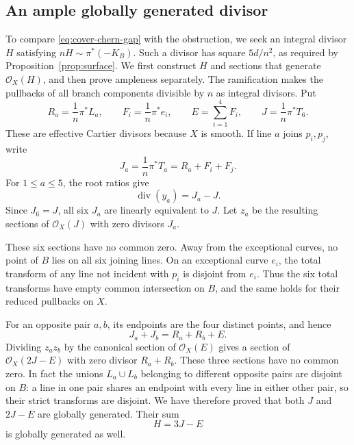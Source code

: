 \subsection{An ample globally generated divisor}

To compare \eqref{eq:cover-chern-gap} with the obstruction, we seek an
integral divisor $H$ satisfying $nH\sim\pi^*(-K_B)$.  Such a divisor has
square $5d/n^2$, as required by Proposition~\ref{prop:surface}.  We first
construct $H$ and sections that generate $\mathcal O_X(H)$, and then
prove ampleness separately.  The ramification makes the pullbacks of all
branch components divisible by $n$ as integral divisors.  Put
\[
 R_a=\frac1n\pi^*L_a,\qquad
 F_i=\frac1n\pi^*e_i,\qquad E=\sum_{i=1}^4F_i,
 \qquad J=\frac1n\pi^*T_6.
\]
These are effective Cartier divisors because $X$ is smooth.  If line
$a$ joins $p_i,p_j$, write
\[
 J_a=\frac1n\pi^*T_a=R_a+F_i+F_j.
\]
For $1\leq a\leq5$, the root ratios give
\[
 \operatorname{div}(y_a)=J_a-J.
\]
Since $J_6=J$, all six $J_a$ are linearly equivalent to $J$.  Let $z_a$ be the resulting
sections of $\mathcal O_X(J)$ with zero divisors $J_a$.

These six sections have no common zero.  Away from the exceptional
curves, no point of $B$ lies on all six joining lines.  On an
exceptional curve $e_i$, the total transform of any line not incident
with $p_i$ is disjoint from $e_i$.  Thus the six total transforms have
empty common intersection on $B$, and the same holds for their reduced
pullbacks on $X$.

For an opposite pair $a,b$, its endpoints are the four distinct points,
and hence
\[
 J_a+J_b=R_a+R_b+E.
\]
Dividing $z_az_b$ by the canonical section of $\mathcal O_X(E)$ gives
a section of $\mathcal O_X(2J-E)$ with zero divisor $R_a+R_b$.  These
three sections have no common zero.  In fact the unions $L_a\cup L_b$
belonging to different opposite pairs are disjoint on $B$: a line in
one pair shares an endpoint with every line in either other pair, so
their strict transforms are disjoint.  We have therefore proved that
both $J$ and $2J-E$ are globally generated.  Their sum
\begin{equation}\label{eq:cover-polarization}
 H=3J-E
\end{equation}
is globally generated as well.

